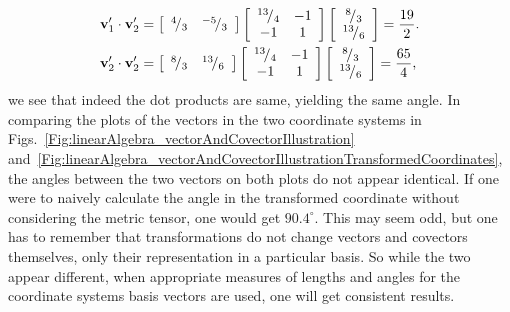 \begin{align}
  \mathbf{v}_1' \cdot \mathbf{v}_2' &= 
  		\left[ \begin{array}{c c} \rfrac{4}{3} & \rfrac{-5}{3} \\ \end{array} \right]
        \left[ \begin{array}{c c} \rfrac{13}{4} & -1 \\
      							  		 -1		& 1  \\ \end{array} \right]
	    \left[ \begin{array}{c} \rfrac{8}{3} \\ \rfrac{13}{6} \\ \end{array} \right] = \frac{19}{2}. \nonumber \\
  \mathbf{v}_2' \cdot \mathbf{v}_2' &= 
  		\left[ \begin{array}{c c} \rfrac{8}{3} & \rfrac{13}{6} \\ \end{array} \right]
        \left[ \begin{array}{c c} \rfrac{13}{4} & -1 \\
      							  		 -1		& 1  \\ \end{array} \right]
	    \left[ \begin{array}{c} \rfrac{8}{3} \\ \rfrac{13}{6} \\ \end{array} \right] = \frac{65}{4}, \nonumber
\end{align}
we see that indeed the dot products are same, yielding the same angle. In comparing the plots of the vectors in the two coordinate systems in Figs.~\ref{Fig:linearAlgebra_vectorAndCovectorIllustration} and~\ref{Fig:linearAlgebra_vectorAndCovectorIllustrationTransformedCoordinates}, the angles between the two vectors on both plots do not appear identical. If one were to naively calculate the angle in the transformed coordinate without considering the metric tensor, one would get $90.4^\circ$. This may seem odd, but one has to remember that transformations do not change vectors and covectors themselves, only their representation in a particular basis. So while the two appear different, when appropriate measures of lengths and angles for the coordinate systems basis vectors are used, one will get consistent results.


